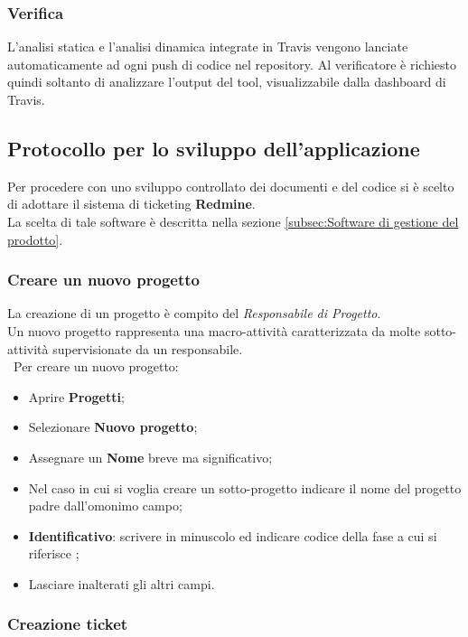 \subsubsection{Verifica}
L’analisi statica e l’analisi dinamica integrate in Travis vengono lanciate automaticamente ad ogni push di codice nel repository. Al verificatore è richiesto quindi soltanto di analizzare l’output del tool, visualizzabile dalla dashboard di Travis.




\subsection{Protocollo per lo sviluppo dell'applicazione}
\label{sec:protocolloSviluppo} 
Per procedere con uno sviluppo controllato dei documenti e del codice si è scelto di adottare il sistema di ticketing \textbf{Redmine}.\\ 
La scelta di tale software è descritta nella sezione \ref{subsec:Software di gestione del prodotto}.

\subsubsection{Creare un nuovo progetto} 

La creazione di un progetto è compito del \emph{Responsabile di Progetto}.\\ 
Un nuovo progetto rappresenta una macro-attività caratterizzata da molte sotto-attività supervisionate da un responsabile.\\\
Per creare un nuovo progetto:
\begin{itemize}
\item Aprire \textbf{Progetti}; 
\item Selezionare \textbf{Nuovo progetto}; 
\item Assegnare un \textbf{Nome} breve ma significativo; 
\item Nel caso in cui si voglia creare un sotto-progetto indicare il nome del progetto padre dall’omonimo campo; 
\item \textbf{Identificativo}: scrivere in minuscolo ed indicare codice\ped{g} della fase a cui si riferisce ;
\item Lasciare inalterati gli altri campi. 
\end{itemize}
 
\subsubsection{Creazione ticket}
 
